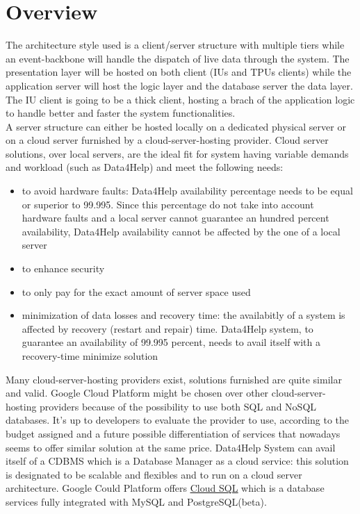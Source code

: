 \section{Overview}
The architecture style used is a client/server structure with multiple tiers while an event-backbone will handle the dispatch of live data through the system. The presentation layer will be hosted on both client (IUs and TPUs clients) while the application server will host the logic layer and the database server the data layer. The IU client is going to be a thick client, hosting a brach of the application logic to handle better and faster the system functionalities. \\ 
A server structure can either be hosted locally on a dedicated physical server or on a cloud server furnished by a cloud-server-hosting provider.
Cloud server solutions, over local servers, are the ideal fit for system having variable demands and workload (such as Data4Help) and meet the following needs:
\begin{itemize}
\item to avoid hardware faults: Data4Help availability percentage needs to be equal or superior to 99.995. Since this percentage do not take into account hardware faults and a local server cannot guarantee an hundred percent availability, Data4Help availability cannot be affected by the one of a local server

\item to enhance security
\item to only pay for the exact amount of server space used
\item minimization of data losses and recovery time: the availabitly of a system is affected by recovery (restart and repair) time. Data4Help system, to guarantee an availability of 99.995 percent, needs to avail itself with a recovery-time minimize solution
\end{itemize} 
Many cloud-server-hosting providers exist, solutions furnished are quite similar and valid.
Google Cloud Platform might be chosen over other cloud-server-hosting providers because of the possibility to use both SQL and NoSQL databases. It’s up to developers to evaluate the provider to use, according to the budget assigned and a future possible differentiation of services that nowadays seems to offer similar solution at the same price. 
Data4Help System can avail itself of a CDBMS which is a Database Manager as a cloud service: this solution is designated to be scalable and flexibles and to run on a cloud server architecture. Google Could Platform offers \href{https://cloud.google.com/sql/}{\underline{Cloud SQL}} which is a database services fully integrated with MySQL and PostgreSQL(beta). 
\clearpage 
